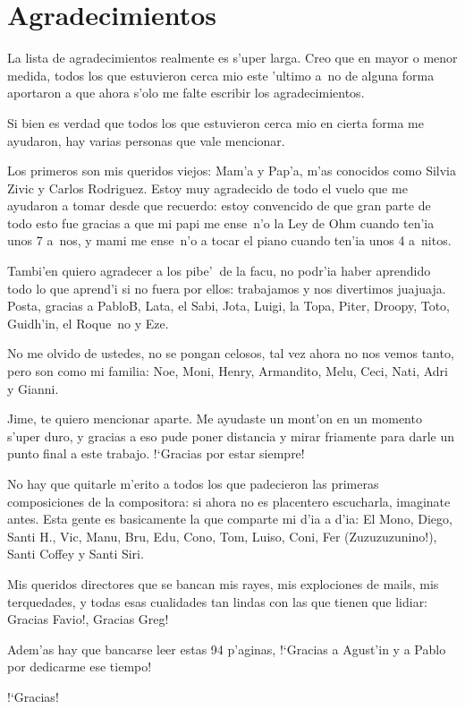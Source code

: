 \section*{Agradecimientos}
La lista de agradecimientos realmente es s'uper larga. Creo que en mayor o menor medida, todos los que estuvieron cerca mio este 'ultimo a~no de alguna forma
aportaron a que ahora s'olo me falte escribir los agradecimientos. \newline

Si bien es verdad que todos los que estuvieron cerca mio en cierta forma me ayudaron, hay varias personas que vale mencionar. \newline

Los primeros son mis queridos viejos: Mam'a y Pap'a, m'as conocidos como Silvia Zivic y Carlos Rodriguez. Estoy muy agradecido de todo el vuelo que me ayudaron a tomar
desde que recuerdo: estoy convencido de que gran parte de todo esto fue gracias a que mi papi me ense~n'o la Ley de Ohm cuando ten'ia unos 7 a~nos, 
y mami me ense~n'o a tocar el piano cuando ten'ia unos 4 a~nitos.\newline

Tambi'en quiero agradecer a los pibe'$\ $ de la facu, no podr'ia haber aprendido todo lo que aprend'i si no fuera por ellos: trabajamos y nos divertimos juajuaja. 
Posta, gracias a PabloB, Lata, el Sabi, Jota, Luigi, la Topa, Piter, Droopy, Toto, Guidh'in, el Roque~no y Eze.\newline

No me olvido de ustedes, no se pongan celosos, tal vez ahora no nos vemos tanto, pero son como mi familia: Noe, Moni, Henry, Armandito, Melu, Ceci, Nati, Adri y 
Gianni. \newline

Jime, te quiero mencionar aparte. Me ayudaste un mont'on en un momento s'uper duro, y gracias a eso pude poner distancia y mirar friamente para darle
un punto final a este trabajo. !`Gracias por estar siempre! \newline

No hay que quitarle m'erito a todos los que padecieron las primeras composiciones de la compositora: si ahora no es placentero escucharla, imaginate antes. 
Esta gente es basicamente la que comparte mi d'ia a d'ia: El Mono, Diego, Santi H., Vic, Manu, Bru, Edu, Cono, Tom, Luiso, Coni, Fer (Zuzuzuzunino!), 
Santi Coffey y Santi Siri.\newline

Mis queridos directores que se bancan mis rayes, mis explociones de mails, mis terquedades, y todas esas cualidades tan lindas con las que tienen que lidiar: 
Gracias Favio!, Gracias Greg!\newline

Adem'as hay que bancarse leer estas 94 p'aginas, !`Gracias a Agust'in y a Pablo por dedicarme ese tiempo!\newline

\begin{center}
\LARGE{!`Gracias!}
\end{center}
